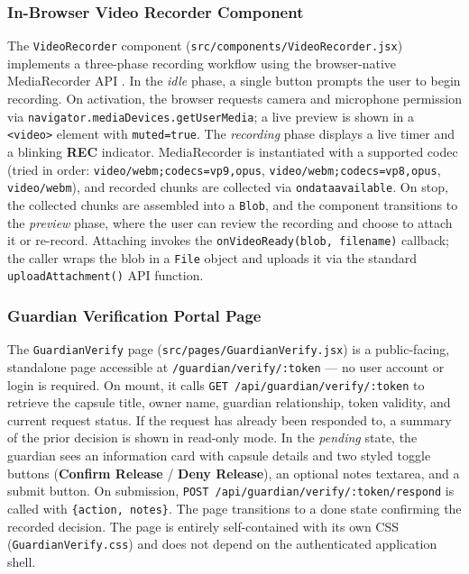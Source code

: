 \documentclass[12pt, a4paper]{article}
\begin{document}
\subsubsection{In-Browser Video Recorder Component}

The \texttt{VideoRecorder} component (\texttt{src/components/VideoRecorder.jsx}) implements a three-phase recording workflow using the browser-native MediaRecorder API \cite{mediarecorder2024}. In the \textit{idle} phase, a single button prompts the user to begin recording. On activation, the browser requests camera and microphone permission via \texttt{navigator.mediaDevices.getUserMedia}; a live preview is shown in a \texttt{<video>} element with \texttt{muted=true}. The \textit{recording} phase displays a live timer and a blinking \textbf{REC} indicator. MediaRecorder is instantiated with a supported codec (tried in order: \texttt{video/webm;codecs=vp9,opus}, \texttt{video/webm;codecs=vp8,opus}, \texttt{video/webm}), and recorded chunks are collected via \texttt{ondataavailable}. On stop, the collected chunks are assembled into a \texttt{Blob}, and the component transitions to the \textit{preview} phase, where the user can review the recording and choose to attach it or re-record. Attaching invokes the \texttt{onVideoReady(blob, filename)} callback; the caller wraps the blob in a \texttt{File} object and uploads it via the standard \texttt{uploadAttachment()} API function.

\subsubsection{Guardian Verification Portal Page}

The \texttt{GuardianVerify} page (\texttt{src/pages/GuardianVerify.jsx}) is a public-facing, standalone page accessible at \texttt{/guardian/verify/:token} — no user account or login is required. On mount, it calls \texttt{GET /api/guardian/verify/:token} to retrieve the capsule title, owner name, guardian relationship, token validity, and current request status. If the request has already been responded to, a summary of the prior decision is shown in read-only mode. In the \textit{pending} state, the guardian sees an information card with capsule details and two styled toggle buttons (\textbf{Confirm Release} / \textbf{Deny Release}), an optional notes textarea, and a submit button. On submission, \texttt{POST /api/guardian/verify/:token/respond} is called with \texttt{\{action, notes\}}. The page transitions to a done state confirming the recorded decision. The page is entirely self-contained with its own CSS (\texttt{GuardianVerify.css}) and does not depend on the authenticated application shell.
\end{document}
